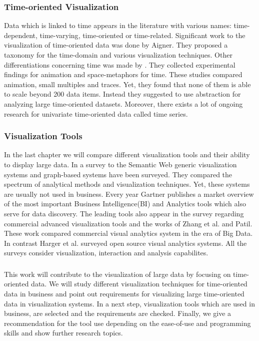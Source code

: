 \subsubsection*{Time-oriented Visualization}
Data which is linked to time appears in the literature with various names: time-dependent\cite{Postfach2003, Tominski2005,Kriglstein2014,Aigner2007,VanBuuren2001,FerreiradeOliveira2003,Yang2003,Chung2014,Rind2011}, time-varying\cite{Moere2004}, time-oriented\cite{Aigner2008,Aigner2007,Aigner2011,Hinum2005,Walker} or time-related\cite{Keimc}. Significant work to the visualization of time-oriented data was done by Aigner\cite{Aigner2011,Aigner2008,Aigner2007}. They proposed a taxonomy for the time-domain and various visualization techniques. Other differentiations concerning time was made by \cite{Kriglstein2014}. They collected experimental findings for animation and space-metaphors for time. These studies compared animation, small multiples and traces. Yet, they found that none of them is able to scale beyond 200 data items\cite{Robertson2013}. Instead they suggested to use abstraction for analyzing large time-oriented datasets. Moreover, there exists a lot of ongoing research for univariate time-oriented data called time series\cite{Aigner2011, Buono, Walker,Leonard,Chen1993,Esling2012}.

\subsubsection*{Visualization Tools}
In the last chapter we will compare different visualization tools and their ability to display large data. In a survey to the Semantic Web generic visualization systems and graph-based systems have been surveyed\cite{Bikakis2016}. They compared the spectrum of analytical methods and visualization techniques. Yet, these systems are usually not used in business. Every year Gartner publishes a market overview of the most important Business Intelligence(BI) and Analytics tools which also serve for data discovery. The leading tools also appear in the survey\cite{Evelson2012} regarding commercial advanced visualization tools and the works of Zhang et al.\cite{Zhanga} and Patil\cite{Patil}. These work compared commercial visual analytics system in the era of Big Data. In contrast Harger et al. surveyed open source visual analytics systems\cite{Harger}. All the surveys consider visualization, interaction and analysis capabilites.

\subsubsection*{}
This work will contribute to the visualization of large data by focusing on time-oriented data. We will study different visualization techniques for time-oriented data in business and point out requirements for visualizing large time-oriented data in visualization systems. In a next step, visualization tools which are used in business, are selected and the requirements are checked. Finally, we give a recommendation for the tool use depending on the ease-of-use and programming skills and show further research topics.